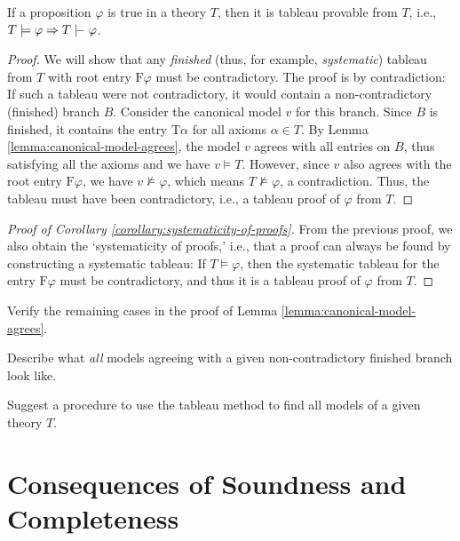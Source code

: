 \begin{theorem}[Completeness]
    If a proposition $\varphi$ is true in a theory $T$, then it is tableau provable from $T$, i.e., $T \models \varphi \Rightarrow T \proves \varphi$.    
\end{theorem}

\begin{proof}
We will show that any \emph{finished} (thus, for example, \emph{systematic}) tableau from $T$ with root entry $\mathrm{F}\varphi$ must be contradictory. The proof is by contradiction: If such a tableau were not contradictory, it would contain a non-contradictory (finished) branch $B$. Consider the canonical model $v$ for this branch. Since $B$ is finished, it contains the entry $\mathrm{T}\alpha$ for all axioms $\alpha \in T$. By Lemma \ref{lemma:canonical-model-agrees}, the model $v$ agrees with all entries on $B$, thus satisfying all the axioms and we have $v \models T$. However, since $v$ also agrees with the root entry $\mathrm{F}\varphi$, we have $v \not\models \varphi$, which means $T \not\models \varphi$, a contradiction. Thus, the tableau must have been contradictory, i.e., a tableau proof of $\varphi$ from $T$.
\end{proof}

\begin{proof}[Proof of Corollary \ref{corollary:systematicity-of-proofs}]
From the previous proof, we also obtain the `systematicity of proofs,' i.e., that a proof can always be found by constructing a systematic tableau: If $T \models \varphi$, then the systematic tableau for the entry $\mathrm{F}\varphi$ must be contradictory, and thus it is a tableau proof of $\varphi$ from $T$.
\end{proof}

\begin{exercise}
    Verify the remaining cases in the proof of Lemma \ref{lemma:canonical-model-agrees}.
\end{exercise}

\begin{exercise}
    Describe what \emph{all} models agreeing with a given non-contradictory finished branch look like.
\end{exercise}

\begin{exercise}
    Suggest a procedure to use the tableau method to find all models of a given theory $T$.
\end{exercise}


\section{Consequences of Soundness and Completeness}

